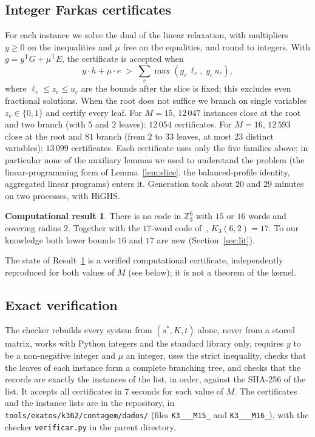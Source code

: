 \documentclass[11pt]{amsart}
\theoremstyle{definition}
\newtheorem{result}[theorem]{Computational result}
\theoremstyle{remark}
\begin{document}
\subsection*{Integer Farkas certificates}
For each instance we solve the dual of the linear relaxation, with multipliers $y\ge0$ on the inequalities and $\mu$ free on the equalities, and round to integers.
With $g=y^{\mathsf T}G+\mu^{\mathsf T}E$, the certificate is accepted when
\[
  y\cdot h+\mu\cdot e \;>\; \sum_c \max(g_c\,\ell_c,\; g_c\,u_c),
\]
where $\ell_c\le z_c\le u_c$ are the bounds after the slice is fixed; this excludes even fractional solutions.
When the root does not suffice we branch on single variables $z_c\in\{0,1\}$ and certify every leaf.
For $M=15$, $12\,047$ instances close at the root and two branch (with $5$ and $2$ leaves): $12\,054$ certificates.
For $M=16$, $12\,593$ close at the root and $81$ branch (from $2$ to $33$ leaves, at most $23$ distinct variables): $13\,099$ certificates.
Each certificate uses only the five families above; in particular none of the auxiliary lemmas we used to understand the problem (the linear-programming form of Lemma~\ref{lem:slice}, the balanced-profile identity, aggregated linear programs) enters it.
Generation took about $20$ and $29$ minutes on two processes, with HiGHS.

\begin{result}\label{res:k362}
There is no code in $\mathbb{Z}_3^6$ with $15$ or $16$ words and covering radius $2$. Together with the $17$-word code of~\cite{hr1991}, $K_3(6,2)=17$. To our knowledge both lower bounds $16$ and $17$ are new (Section~\ref{sec:lit}).
\end{result}
The state of Result~\ref{res:k362} is a verified computational certificate, independently reproduced for both values of $M$ (see below); it is not a theorem of the kernel.

\subsection*{Exact verification}
The checker rebuilds every system from $(s^*,K,t)$ alone, never from a stored matrix, works with Python integers and the standard library only, requires $y$ to be a non-negative integer and $\mu$ an integer, uses the strict inequality, checks that the leaves of each instance form a complete branching tree, and checks that the records are exactly the instances of the list, in order, against the SHA-256 of the list.
It accepts all certificates in $7$ seconds for each value of $M$.
The certificates and the instance lists are in the repository, in \texttt{tools/\allowbreak exatos/\allowbreak k362/\allowbreak contagem/\allowbreak dados/} (files \texttt{K3\_\_\_\allowbreak M15\_\allowbreak *} and \texttt{K3\_\_\_\allowbreak M16\_\allowbreak *}), with the checker \texttt{verificar.py} in the parent directory.
\end{document}
